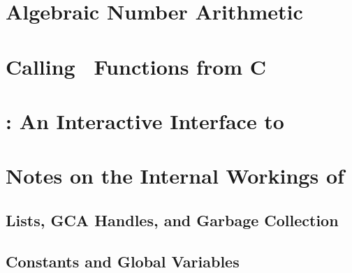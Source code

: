 


\chapter{Algebraic Number Arithmetic}
\label{c:AN}




\appendix
\clearpage
\chapter{Calling \saclib\ Functions from C}
\label{c:CFC}




\chapter{\isac: An Interactive Interface to \saclib}
\label{c:ISAC}




\chapter{Notes on the Internal Workings of \saclib}
\label{c:NIW}

\section{Lists, GCA Handles, and Garbage Collection}
\label{c:NIW s:GC}



\section{Constants and Global Variables}
\label{c:NIW s:CGV}




%
%


%
%

\clearpage
{}
\printindex



